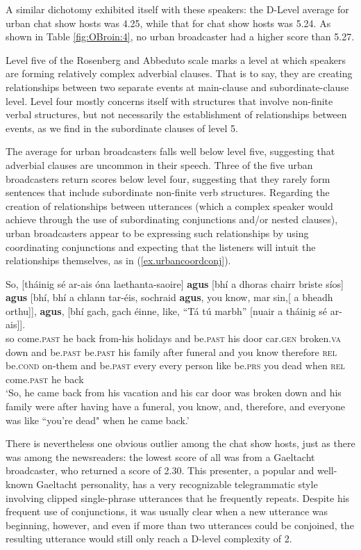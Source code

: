 \documentclass[output=paper,colorlinks,citecolor=brown]{langscibook}
\begin{document}
A similar dichotomy exhibited itself with these speakers: the D-Level average for urban chat show hosts was 4.25, while that for  chat show hosts was 5.24. As shown in Table \ref{fig:OBroin:4}, no urban broadcaster had a higher score than 5.27.

Level five of the Rosenberg and Abbeduto scale marks a level at which speakers are forming relatively complex adverbial clauses. That is to say, they are creating relationships between two separate events at main-clause and subordinate-clause level. Level four mostly concerns itself with structures that involve non-finite verbal structures, but not necessarily the establishment of relationships between events, as we find in the subordinate clauses of level 5.

The average for urban broadcasters falls well below level five, suggesting that adverbial clauses are uncommon in their speech. Three of the five urban broadcasters return scores below level four, suggesting that they rarely form sentences that include subordinate non-finite verb structures. Regarding the creation of relationships between utterances (which a complex speaker would achieve through the use of subordinating conjunctions and/or nested clauses), urban broadcasters appear to be expressing such relationships by using coordinating conjunctions and expecting that the listeners will intuit the relationships themselves, as in (\ref{ex.urbancoordconj}).

\ea\label{ex.urbancoordconj}
\gll So, [tháinig sé ar-ais óna laethanta-saoire] \textbf{agus} [bhí a dhoras chairr briste síos] \textbf{agus} [bhí, bhí a chlann tar-éis, sochraid \textbf{agus}, you know, {mar sin},[ a bheadh orthu]], \textbf{agus}, [bhí gach, gach éinne, like, “Tá tú marbh” [nuair a tháinig sé ar-ais]].\\
so come.\textsc{past} he back from-his holidays and be.\textsc{past} his door car.\textsc{gen} broken.\textsc{va} down and be.\textsc{past} be.\textsc{past} his family after funeral and you know therefore \textsc{rel} be.\textsc{cond} on-them and be.\textsc{past} every every person like be.\textsc{prs} you dead when \textsc{rel} come.\textsc{past} he back\\
\glt ‘So, he came back from his vacation and his car door was broken down and his family were after having have a funeral, you know, and, therefore, and everyone was like ``you're dead" when he came back.’
\z

There is nevertheless one obvious outlier among the chat show hosts, just as there was among the newsreaders: the lowest score of all was from a Gaeltacht broadcaster, who returned a score of 2.30. This presenter, a popular and well-known Gaeltacht personality, has a very recognizable telegrammatic style involving clipped single-phrase utterances that he frequently repeats. Despite his frequent use of conjunctions, it was usually clear when a new utterance was beginning, however, and even if more than two utterances could be conjoined, the resulting utterance would still only reach a D-level complexity of 2. 
\end{document}
